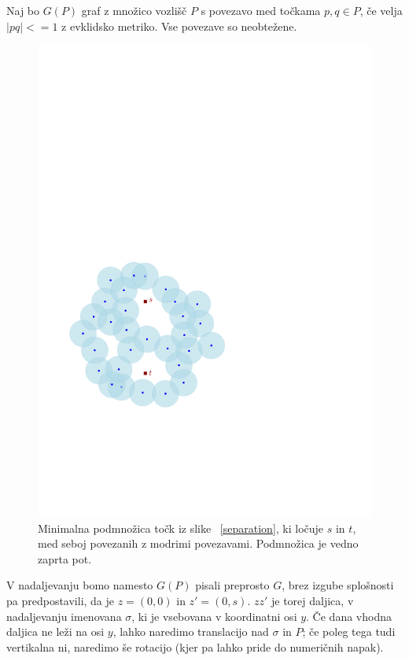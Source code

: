 \documentclass[a4paper, 12pt]{book}
\begin{document}
Naj bo $G(P)$ graf z množico vozlišč $P$ s povezavo med točkama $p,q \in P$, če velja $|pq| <= 1$ z evklidsko metriko. Vse povezave so neobtežene.

\begin{figure}
\centerline{\includegraphics[scale=0.6,page=3]{pics/separation.pdf}}
\caption{Minimalna podmnožica točk iz slike ~\ref{separation}, ki ločuje $s$ in $t$, med seboj povezanih z modrimi povezavami. Podmnožica je vedno zaprta pot.}
\label{walk}
\end{figure}

V nadaljevanju bomo namesto $G(P)$ pisali preprosto $G$, brez izgube splošnosti pa predpostavili, da je $z=(0,0)$ in $z'=(0,s)$. $zz'$ je torej daljica, v nadaljevanju imenovana $\sigma$, ki je vsebovana v koordinatni osi $y$. Če dana vhodna daljica ne leži na osi $y$, lahko naredimo translacijo nad $\sigma$ in $P$; če poleg tega tudi vertikalna ni, naredimo še rotacijo (kjer pa lahko pride do numeričnih napak). 
\end{document}
